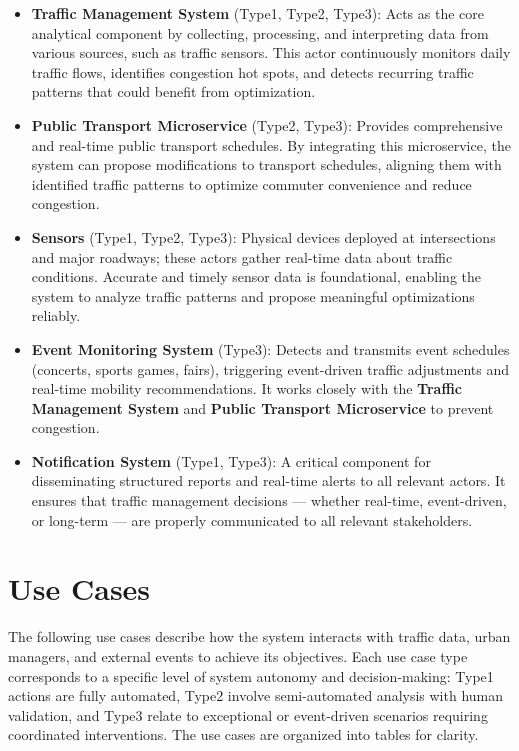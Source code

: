 \documentclass[a4paper,12pt]{article}
\begin{document}
\begin{itemize}
    \item \textbf{Traffic Management System} (Type1, Type2, Type3): Acts as the core analytical component by collecting, processing, and interpreting data from various sources, such as traffic sensors. This actor continuously monitors daily traffic flows, identifies congestion hot spots, and detects recurring traffic patterns that could benefit from optimization.
    \item \textbf{Public Transport Microservice} (Type2, Type3): Provides comprehensive and real-time public transport schedules. By integrating this microservice, the system can propose modifications to transport schedules, aligning them with identified traffic patterns to optimize commuter convenience and reduce congestion.
    \item \textbf{Sensors} (Type1, Type2, Type3): Physical devices deployed at intersections and major roadways; these actors gather real-time data about traffic conditions. Accurate and timely sensor data is foundational, enabling the system to analyze traffic patterns and propose meaningful optimizations reliably.
    \item \textbf{Event Monitoring System} (Type3): Detects and transmits event schedules (concerts, sports games, fairs), triggering event-driven traffic adjustments and real-time mobility recommendations. It works closely with the \textbf{Traffic Management System} and \textbf{Public Transport Microservice} to prevent congestion.
    \item \textbf{Notification System} (Type1, Type3): A critical component for disseminating structured reports and real-time alerts to all relevant actors. It ensures that traffic management decisions — whether real-time, event-driven, or long-term — are properly communicated to all relevant stakeholders.
\end{itemize}

\newpage

\section{Use Cases}
The following use cases describe how the system interacts with traffic data, urban managers, and external events to achieve its objectives. Each use case type corresponds to a specific level of system autonomy and decision-making: Type1 actions are fully automated, Type2 involve semi-automated analysis with human validation, and Type3 relate to exceptional or event-driven scenarios requiring coordinated interventions. The use cases are organized into tables for clarity.
\end{document}

